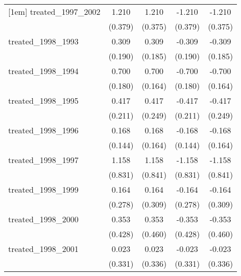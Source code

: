 {\begin{tabular}{l*{4}{c}}
[1em]
treated\_1997\_2002&       1.210\sym{**} &       1.210\sym{**} &      -1.210\sym{**} &      -1.210\sym{**} \\
            &     (0.379)         &     (0.375)         &     (0.379)         &     (0.375)         \\
[1em]
treated\_1998\_1993&       0.309         &       0.309         &      -0.309         &      -0.309         \\
            &     (0.190)         &     (0.185)         &     (0.190)         &     (0.185)         \\
[1em]
treated\_1998\_1994&       0.700\sym{***}&       0.700\sym{***}&      -0.700\sym{***}&      -0.700\sym{***}\\
            &     (0.180)         &     (0.164)         &     (0.180)         &     (0.164)         \\
[1em]
treated\_1998\_1995&       0.417\sym{*}  &       0.417         &      -0.417\sym{*}  &      -0.417         \\
            &     (0.211)         &     (0.249)         &     (0.211)         &     (0.249)         \\
[1em]
treated\_1998\_1996&       0.168         &       0.168         &      -0.168         &      -0.168         \\
            &     (0.144)         &     (0.164)         &     (0.144)         &     (0.164)         \\
[1em]
treated\_1998\_1997&       1.158         &       1.158         &      -1.158         &      -1.158         \\
            &     (0.831)         &     (0.841)         &     (0.831)         &     (0.841)         \\
[1em]
treated\_1998\_1999&       0.164         &       0.164         &      -0.164         &      -0.164         \\
            &     (0.278)         &     (0.309)         &     (0.278)         &     (0.309)         \\
[1em]
treated\_1998\_2000&       0.353         &       0.353         &      -0.353         &      -0.353         \\
            &     (0.428)         &     (0.460)         &     (0.428)         &     (0.460)         \\
[1em]
treated\_1998\_2001&       0.023         &       0.023         &      -0.023         &      -0.023         \\
            &     (0.331)         &     (0.336)         &     (0.331)         &     (0.336)         \\

\end{tabular}}
